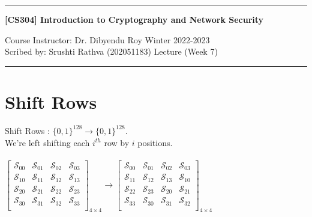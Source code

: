 \documentclass[11pt]{article}
\begin{document}
\noindent
\rule{\textwidth}{1pt}
\begin{center}
{\bf [CS304] Introduction to Cryptography and Network Security}
\end{center}
Course Instructor: Dr. Dibyendu Roy \hfill Winter 2022-2023 \\
Scribed by: Srushti Rathva (202051183) \hfill Lecture (Week 7) \\
\rule{\textwidth}{1pt}

\section*{Shift Rows}
Shift Rows : $\{0,1\}^{128} \rightarrow \{0,1\}^{128}$. \\
We're left shifting each $i^{th}$ row by $i$ positions. \\
\\
$
\begin{bmatrix}
\mathcal{S}_{00} & \mathcal{S}_{01} & \mathcal{S}_{02} & \mathcal{S}_{03} \\
\mathcal{S}_{10} & \mathcal{S}_{11} & \mathcal{S}_{12} & \mathcal{S}_{13} \\
\mathcal{S}_{20} & \mathcal{S}_{21} & \mathcal{S}_{22} & \mathcal{S}_{23} \\
\mathcal{S}_{30} & \mathcal{S}_{31} & \mathcal{S}_{32} & \mathcal{S}_{33} \\
\end{bmatrix}
_{4\times4}
\rightarrow
\begin{bmatrix}
\mathcal{S}_{00} & \mathcal{S}_{01} & \mathcal{S}_{02} & \mathcal{S}_{03} \\
\mathcal{S}_{11} & \mathcal{S}_{12} & \mathcal{S}_{13} & \mathcal{S}_{10}
\\
\mathcal{S}_{22} & \mathcal{S}_{23} & \mathcal{S}_{20} & \mathcal{S}_{21}
\\
\mathcal{S}_{33} & \mathcal{S}_{30} & \mathcal{S}_{31} & \mathcal{S}_{32}
\\
\end{bmatrix}
_{4\times4}
$ 
\end{document}

